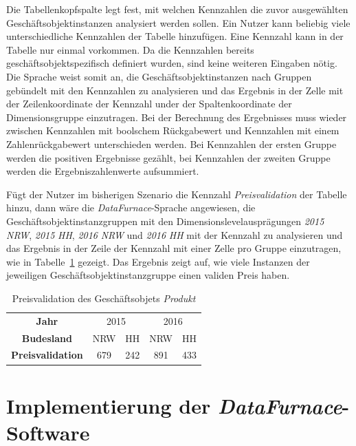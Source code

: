 \documentclass[
  language=german, %
  type=bachelor,%
  ngerman
]{isthesis}
\begin{document}
\begin{content}
  Die Tabellenkopfspalte legt fest, mit welchen Kennzahlen die zuvor
  ausgewählten Geschäftsobjektinstanzen analysiert werden sollen. Ein Nutzer
  kann beliebig viele unterschiedliche Kennzahlen der Tabelle hinzufügen. Eine
  Kennzahl kann in der Tabelle nur einmal vorkommen. Da die Kennzahlen bereits
  geschäftsobjektspezifisch definiert wurden, sind keine weiteren Eingaben
  nötig. Die Sprache weist somit an, die Geschäftsobjektinstanzen nach Gruppen
  gebündelt mit den Kennzahlen zu analysieren und das Ergebnis in der Zelle mit
  der Zeilenkoordinate der Kennzahl under der Spaltenkoordinate der
  Dimensionsgruppe einzutragen. Bei der Berechnung des Ergebnisses muss wieder
  zwischen Kennzahlen mit boolschem Rückgabewert und Kennzahlen mit einem
  Zahlenrückgabewert unterschieden werden. Bei Kennzahlen der ersten
  Gruppe werden die positiven Ergebnisse gezählt, bei Kennzahlen der zweiten
  Gruppe werden die Ergebniszahlenwerte aufsummiert.
  
	Fügt der Nutzer im bisherigen Szenario die Kennzahl \textit{Preisvalidation}
	der Tabelle hinzu, dann wäre die \textit{DataFurnace}-Sprache angewiesen, die
	Geschäftsobjektinstanzgruppen mit den Dimensionslevelausprägungen
	\textit{2015} \textit{NRW}, \textit{2015} \textit{HH}, \textit{2016}
	\textit{NRW} und \textit{2016} \textit{HH} mit der Kennzahl zu analysieren
	und das Ergebnis in der Zeile der Kennzahl mit einer Zelle pro Gruppe
	einzutragen, wie in Tabelle~\ref{table:preisvalidation} gezeigt. Das Ergebnis
	zeigt auf, wie viele Instanzen der jeweiligen Geschäftsobjektinstanzgruppe
	einen validen Preis haben.

  \begin{table}
    \footnotesize
    \begin{tabular}{c c c c c}
      \textbf{Jahr} & \multicolumn{2}{c}{2015} & \multicolumn{2}{c}{2016} \\
      \cmidrule(lr){2-3}\cmidrule(lr){4-5}
      \textbf{Budesland} & NRW & HH & NRW & HH \\
      \toprule
      \textbf{Preisvalidation} & 679 & 242 & 891 & 433 \\
    \end{tabular}
    \caption{Preisvalidation des Geschäftsobjets \textit{Produkt}}\label{table:preisvalidation}
  \end{table}


  \chapter{Implementierung der \textit{DataFurnace}-Software}\label{ch:implementierung-datafurnace}


\end{content}
\end{document}
